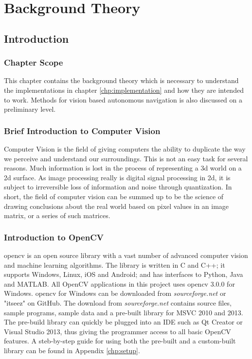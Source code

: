 \chapter{Background Theory}\label{chp:theory}

\section{Introduction}

\subsection{Chapter Scope}
This chapter contains the background theory which is necessary to understand the implementations in chapter \ref{chp:implementation} and how they are intended to work. Methods for vision based autonomous navigation is also discussed on a preliminary level. 

\subsection{Brief Introduction to Computer Vision}
Computer Vision is the field of giving computers the ability to duplicate the way we perceive and understand our surroundings. This is not an easy task for several reasons. Much information is lost in the process of representing a 3d world on a 2d surface. As image processing really is digital signal processing in 2d, it is subject to irreversible loss of information and noise through quantization. In short, the field of computer vision can be summed up to be the science of drawing conclusions about the real world based on pixel values in an image matrix, or a series of such matrices.

\subsection{Introduction to OpenCV}

\gls{opencv} is an  open source library with a vast number of advanced computer vision and machine learning algorithms. The library is written in C and C++; it supports Windows, Linux, iOS and Android; and has interfaces to Python, Java and MATLAB. All OpenCV applications in this project uses \gls{opencv} 3.0.0 for Windows. \gls{opencv} for Windows can be downloaded from \textit{sourceforge.net} or "itseez" on GitHub. The download from \textit{sourceforge.net} contains source files, sample programs, sample data and a pre-built library for MSVC 2010 and 2013. The pre-build library can quickly be plugged into  an IDE such as Qt Creator or Visual Studio 2013, thus giving the programmer access to all basic OpenCV features. A steb-by-step guide for using both the pre-built and a custom-built library can be found in Appendix \ref{chp:setup}.

